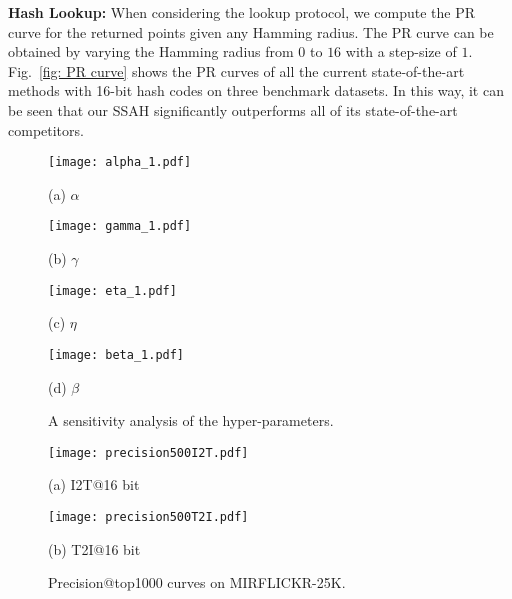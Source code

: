 \documentclass[10pt,twocolumn,letterpaper]{article}
\begin{document}
\textbf{Hash Lookup:} When considering the lookup protocol, we compute the PR curve for the returned points given any Hamming radius. The PR curve can be obtained by varying the Hamming radius from $0$ to $16$ with a step-size of $1$. Fig.~\ref{fig: PR curve} shows the PR curves of all the current state-of-the-art methods with 16-bit hash codes on three benchmark datasets. In this way, it can be seen that our SSAH significantly outperforms all of its state-of-the-art competitors.
\begin{figure*}[!t]
	\centering
	\begin{minipage}[b]{0.24\textwidth}
		\vspace{-0.1cm}
		\centering
		\texttt{[image: alpha\_1.pdf]}
		\vspace{-0.3cm}
		\caption*{(a) $\alpha$}
	\end{minipage}%
	\begin{minipage}[b]{0.24\textwidth}
		\vspace{-0.25cm}
		\centering
		\texttt{[image: gamma\_1.pdf]}
		\vspace{-0.3cm}
		\caption*{(b) $\gamma$}
	\end{minipage}
	\begin{minipage}[b]{0.24\textwidth}
		\vspace{-0.25cm}
		\centering
		\texttt{[image: eta\_1.pdf]}
		\vspace{-0.3cm}
		\caption*{(c) $\eta$}
	\end{minipage}
	\begin{minipage}[b]{0.24\textwidth}
		\vspace{-0.25cm}
		\centering
		\texttt{[image: beta\_1.pdf]}
		\vspace{-0.3cm}
		\caption*{(d) $\beta$}
	\end{minipage}
	\vspace{-0.25cm}
	\caption{A sensitivity analysis of the hyper-parameters.}
	\label{fig::hyperparameters}
	\vspace{-0.6cm}
\end{figure*}
\begin{figure}[!t]
	\begin{center}
		\begin{minipage}[b]{0.24\textwidth}
			\centering
			\texttt{[image: precision500I2T.pdf]}
			\vspace{-0.2cm}
			\caption*{(a) I2T@16 bit}
		\end{minipage}%
		\begin{minipage}[b]{0.24\textwidth}
			\centering
			\texttt{[image: precision500T2I.pdf]}
			\vspace{-0.2cm}
			\caption*{(b) T2I@16 bit}
		\end{minipage}
	\end{center}
	\vspace{-0.55cm}
	\caption{Precision@top1000 curves on MIRFLICKR-25K.}
	\label{fig::MIRFLICKR-25K}
	\vspace{-0.5cm}
\end{figure}
\end{document}
